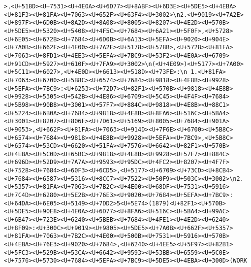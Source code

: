 \documentclass[
]{article}
\begin{document}
\begin{verbatim}
>,<U+518D><U+7531><U+4E0A><U+6D77><U+8ABF><U+6D3E><U+5DE5><U+4EBA><U+81F3><U+81FA><U+7063><U+652F><U+63F4><U+3002>\n2.<U+9019><U+7A2E><U+897F><U+6D0B><U+8A2D><U+8A08><U+8005><U+8207><U+4E2D><U+570B><U+5DE5><U+5320><U+5408><U+4F5C><U+7684><U+6A21><U+5F0F>,<U+5728><U+6E05><U+672B><U+7684><U+6D0B><U+6A13><U+5EFA><U+9020><U+904E><U+7A0B><U+662F><U+4E00><U+7A2E><U+5178><U+578B>,<U+5728><U+81FA><U+7063><U+8FD1><U+4EE3><U+5EFA><U+7BC9><U+53F2><U+4E0A><U+6709><U+91CD><U+5927><U+610F><U+7FA9><U+3002>\n(<U+4E09>)<U+5177><U+7A00><U+5C11><U+6027>,<U+4E0D><U+6613><U+518D><U+73FE>:\n 1.<U+81FA><U+7063><U+6700><U+5B8C><U+6574><U+7684><U+9818><U+4E8B><U+9928><U+5EFA><U+7BC9>:<U+6253><U+72D7><U+82F1><U+570B><U+9818><U+4E8B><U+9928><U+5305><U+542B><U+4E86><U+6709><U+5C45><U+4F4F><U+7684><U+5B98><U+90B8><U+3001><U+57F7><U+884C><U+9818><U+4E8B><U+88C1><U+5224><U+6B0A><U+7684><U+9818><U+4E8B><U+8FA6><U+516C><U+5BA4><U+3001><U+8207><U+806F><U+7D61><U+5169><U+8005><U+7684><U+901A><U+9053>,<U+662F><U+81FA><U+7063><U+914D><U+7F6E><U+6700><U+5B8C><U+6574><U+7684><U+9818><U+4E8B><U+9928><U+5EFA><U+7BC9>,<U+5B8C><U+6574><U+53CD><U+6620><U+51FA><U+7576><U+6642><U+82F1><U+570B><U+4EBA><U+5C0D><U+65BC><U+9818><U+4E8B><U+9928><U+57F7><U+884C><U+696D><U+52D9><U+7A7A><U+9593><U+95DC><U+4FC2><U+8207><U+4F7F><U+7528><U+7684><U+60F3><U+6CD5>,<U+5177><U+6709><U+73CD><U+8CB4><U+7684><U+6587><U+5316><U+8CC7><U+7522><U+50F9><U+503C><U+3002>\n2.<U+5357><U+81FA><U+7063><U+7B2C><U+4E00><U+68DF><U+7531><U+5916><U+7C4D><U+6280><U+5E2B><U+76E3><U+9020><U+7684><U+5EFA><U+7BC9>:<U+64DA><U+6E05><U+5149><U+7DD2>5<U+5E74>(1879)<U+82F1><U+570B><U+5DE5><U+90E8><U+4E0A><U+6D77><U+8FA6><U+516C><U+5BA4><U+99AC><U+6B47><U+723E><U+6240><U+5BEB><U+7684><U+4FE1><U+4E2D><U+6240><U+8F09>:<U+300C><U+9019><U+9805><U+5DE5><U+7A0B><U+662F><U+5357><U+81FA><U+7063><U+7B2C><U+4E00><U+500B><U+7531><U+5916><U+570B><U+4EBA><U+76E3><U+9020><U+7684>,<U+6240><U+4EE5><U+5F97><U+82B1><U+5FC3><U+529B><U+53CA><U+6642><U+9593><U+53BB><U+6559><U+5C0E><U+7576><U+5730><U+7684><U+5EFA><U+7BC9><U+5DE5><U+4EBA><U+300D>(WORK 
\end{verbatim}
\end{document}
